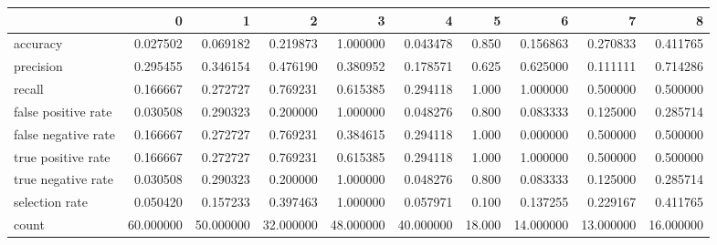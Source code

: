 \begin{tabular}{lrrrrrrrrr}
\toprule
{} &          0 &          1 &          2 &          3 &          4 &       5 &          6 &          7 &          8 \\
\midrule
accuracy            &   0.027502 &   0.069182 &   0.219873 &   1.000000 &   0.043478 &   0.850 &   0.156863 &   0.270833 &   0.411765 \\
precision           &   0.295455 &   0.346154 &   0.476190 &   0.380952 &   0.178571 &   0.625 &   0.625000 &   0.111111 &   0.714286 \\
recall              &   0.166667 &   0.272727 &   0.769231 &   0.615385 &   0.294118 &   1.000 &   1.000000 &   0.500000 &   0.500000 \\
false positive rate &   0.030508 &   0.290323 &   0.200000 &   1.000000 &   0.048276 &   0.800 &   0.083333 &   0.125000 &   0.285714 \\
false negative rate &   0.166667 &   0.272727 &   0.769231 &   0.384615 &   0.294118 &   1.000 &   0.000000 &   0.500000 &   0.500000 \\
true positive rate  &   0.166667 &   0.272727 &   0.769231 &   0.615385 &   0.294118 &   1.000 &   1.000000 &   0.500000 &   0.500000 \\
true negative rate  &   0.030508 &   0.290323 &   0.200000 &   1.000000 &   0.048276 &   0.800 &   0.083333 &   0.125000 &   0.285714 \\
selection rate      &   0.050420 &   0.157233 &   0.397463 &   1.000000 &   0.057971 &   0.100 &   0.137255 &   0.229167 &   0.411765 \\
count               &  60.000000 &  50.000000 &  32.000000 &  48.000000 &  40.000000 &  18.000 &  14.000000 &  13.000000 &  16.000000 \\
\bottomrule
\end{tabular}
